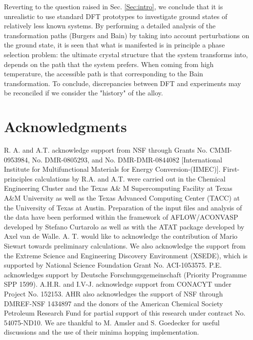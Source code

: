 \documentclass[%
preprint,
 amsmath,amssymb,
 aps,
prb,
showkeys,
]{revtex4-1}
\begin{document}
Reverting to the question raised in Sec. \ref{Sec:intro},  we conclude that  it is  unrealistic to use standard DFT prototypes to investigate ground states of relatively  less known systems. By performing a detailed analysis of the transformation paths (Burgers and Bain) by taking into account perturbations on the ground state, it is seen that what is manifested is in principle a phase selection problem: the ultimate crystal structure that the system transforms into, depends on the path that the system prefers. When coming from high temperature, the accessible path is that corresponding to  the Bain transformation. To conclude, discrepancies between DFT and experiments may be reconciled if we consider the  "history" of the alloy.
\section*{Acknowledgments}
R. A. and A.T. acknowledge support from NSF through Grants No. CMMI-0953984, No. DMR-0805293, and No. DMR-DMR-0844082 [International Institute for Multifunctional Materials for Energy Conversion-(IIMEC)]. First-principles calculations by R.A. and A.T. were carried out in the Chemical Engineering Cluster and the Texas A\& M Supercomputing Facility at Texas A\&M University as well as the Texas Advanced Computing Center (TACC) at the University of Texas at Austin. Preparation of the input files and analysis of the data have been performed within the framework  of AFLOW/ACONVASP developed by Stefano Curtarolo as well as with the ATAT package developed by Axel van de Walle. A. T. would like to acknowledge the contribution of  Mario Siewart towards preliminary calculations.
We also acknowledge the support from the Extreme Science and Engineering Discovery Environment (XSEDE), which is supported by National Science Foundation Grant No. ACI-1053575. P.E. acknowledges support by Deutsche Forschungsgemeinschaft (Priority Programme SPP 1599). A.H.R. and I.V-J. acknowledge support from CONACYT under Project No. 152153. AHR also acknowledges the support of NSF through DMREF-NSF 1434897 and the donors of the American Chemical Society Petroleum Research Fund for partial support of this research under contract No. 54075-ND10. We are thankful to M. Amsler and S. Goedecker for useful discussions and the use of  their minima hopping implementation.	

\end{document}
